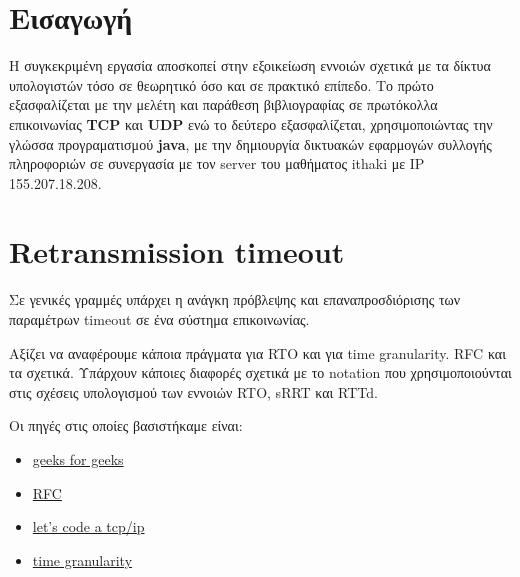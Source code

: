 \documentclass[hidelinks, 12pt, a4paper]{article}
\begin{document}



\pagebreak
\tableofcontents
\pagebreak



\section{Εισαγωγή}

Η συγκεκριμένη εργασία αποσκοπεί στην εξοικείωση εννοιών σχετικά με τα δίκτυα υπολογιστών τόσο σε θεωρητικό όσο και σε πρακτικό επίπεδο. Το πρώτο εξασφαλίζεται με την μελέτη και παράθεση βιβλιογραφίας σε πρωτόκολλα επικοινωνίας \textbf{TCP} και \textbf{UDP} ενώ το δεύτερο εξασφαλίζεται, χρησιμοποιώντας την γλώσσα προγραματισμού \textbf{java}, με την δημιουργία δικτυακών εφαρμογών συλλογής πληροφοριών σε συνεργασία με τον server του μαθήματος ithaki με IP 155.207.18.208.

\section{Retransmission timeout}

Σε γενικές γραμμές υπάρχει η ανάγκη πρόβλεψης και επαναπροσδιόρισης των παραμέτρων timeout σε ένα σύστημα επικοινωνίας.

Αξίζει να αναφέρουμε κάποια πράγματα για RTO και για time granularity. RFC και τα σχετικά. Υπάρχουν κάποιες διαφορές σχετικά με το notation που χρησιμοποιούνται στις σχέσεις υπολογισμού των εννοιών RTO, sRRT και RTTd. 

Οι πηγές στις οποίες βασιστήκαμε είναι:
\begin{itemize}
    \item \href{https://www.geeksforgeeks.org/tcp-timers/}{geeks for geeks}
    \item \href{https://tools.ietf.org/html/rfc6298}{RFC}
    \item \href{https://www.saminiir.com/lets-code-tcp-ip-stack-5-tcp-retransmission/}{let's code a tcp/ip}
    \item \href{https://stackoverflow.com/questions/16740014/computing-time-on-linux-granularity-and-precision}{time granularity}
\end{itemize}
\end{document}
